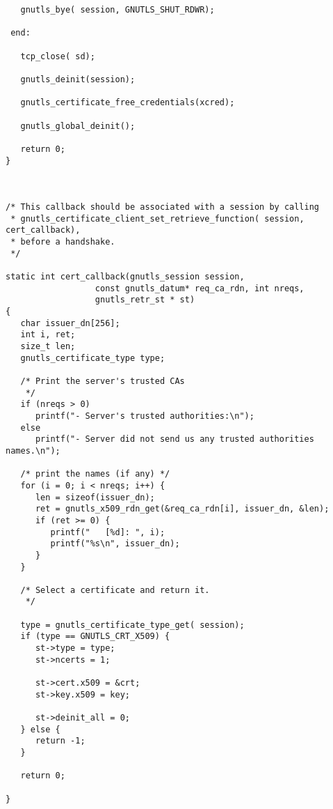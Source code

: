 \begin{verbatim}
   gnutls_bye( session, GNUTLS_SHUT_RDWR);

 end:

   tcp_close( sd);

   gnutls_deinit(session);

   gnutls_certificate_free_credentials(xcred);

   gnutls_global_deinit();

   return 0;
}



/* This callback should be associated with a session by calling
 * gnutls_certificate_client_set_retrieve_function( session, cert_callback),
 * before a handshake.
 */

static int cert_callback(gnutls_session session,
                  const gnutls_datum* req_ca_rdn, int nreqs,
                  gnutls_retr_st * st)
{
   char issuer_dn[256];
   int i, ret;
   size_t len;
   gnutls_certificate_type type;

   /* Print the server's trusted CAs
    */
   if (nreqs > 0)
      printf("- Server's trusted authorities:\n");
   else
      printf("- Server did not send us any trusted authorities names.\n");

   /* print the names (if any) */
   for (i = 0; i < nreqs; i++) {
      len = sizeof(issuer_dn);
      ret = gnutls_x509_rdn_get(&req_ca_rdn[i], issuer_dn, &len);
      if (ret >= 0) {
         printf("   [%d]: ", i);
         printf("%s\n", issuer_dn);
      }
   }

   /* Select a certificate and return it.
    */

   type = gnutls_certificate_type_get( session);
   if (type == GNUTLS_CRT_X509) {
      st->type = type;
      st->ncerts = 1;

      st->cert.x509 = &crt;
      st->key.x509 = key;

      st->deinit_all = 0;
   } else {
      return -1;
   }

   return 0;

}

\end{verbatim}
